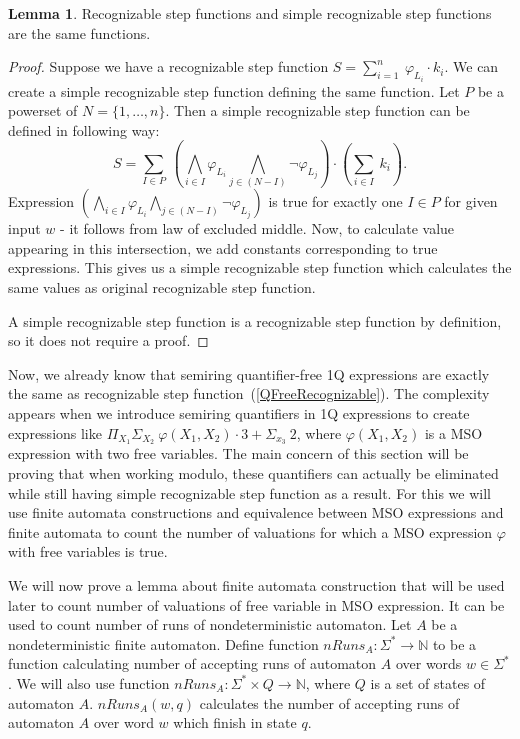 \documentclass[12pt]{article}
\theoremstyle{definition}
\newtheorem{lemma}[theorem]{Lemma}
\begin{document}
\begin{lemma}
    \label{RecEqSimpleRec}
    Recognizable step functions and simple recognizable step functions are the same functions.
\end{lemma}

\begin{proof}
    Suppose we have a recognizable step function $S = \sum_{i = 1}^{n} \ \varphi_{L_i} \cdot k_i$. We can create a simple recognizable step function defining the same function. Let $P$ be a powerset of $N = \{1,\ldots,n\}$. Then a simple recognizable step function can be defined in following way:
    $$S = \sum_{I \in P} \ (\bigwedge_{i \in I} \varphi_{L_i} \bigwedge_{j \in (N-I)} \neg \varphi_{L_j}) \cdot (\sum_{i \in I} \ k_i).$$
    Expression $(\bigwedge_{i \in I} \varphi_{L_i} \bigwedge_{j \in (N-I)} \neg \varphi_{L_j})$ is true for exactly one $I \in P$ for given input $w$ - it follows from law of excluded middle. Now, to calculate value appearing in this intersection, we add constants corresponding to true expressions. This gives us a simple recognizable step function which calculates the same values as original recognizable step function.

    A simple recognizable step function is a recognizable step function by definition, so it does not require a proof.
\end{proof}

Now, we already know that semiring quantifier-free 1Q expressions are exactly the same as recognizable step function~(\cref{QFreeRecognizable}). The complexity appears when we introduce semiring quantifiers in 1Q expressions to create expressions like $\Pi_{X_1} \Sigma_{X_2} \ \varphi(X_1, X_2) \cdot 3 + \Sigma_{x_3} \ 2$, where $\varphi(X_1, X_2)$ is a MSO expression with two free variables. The main concern of this section will be proving that when working modulo, these quantifiers can actually be eliminated while still having simple recognizable step function as a result. For this we will use finite automata constructions and equivalence between MSO expressions and finite automata to count the number of valuations for which a MSO expression $\varphi$ with free variables is true.

We will now prove a lemma about finite automata construction that will be used later to count number of valuations of free variable in MSO expression. It can be used to count number of runs of nondeterministic automaton. Let $A$ be a nondeterministic finite automaton. Define function $nRuns_A : \Sigma^* \rightarrow \mathbb{N}$ to be a function calculating number of accepting runs of automaton $A$ over words $w \in \Sigma^*$. We will also use function $nRuns_A : \Sigma^* \times Q \rightarrow \mathbb{N}$, where $Q$ is a set of states of automaton $A$. $nRuns_A(w, q)$ calculates the number of accepting runs of automaton $A$ over word $w$ which finish in state $q$.
\end{document}
